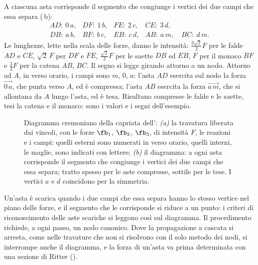 \begin{esempio}
\begin{svolgimento}
		A ciascuna asta corrisponde il segmento che congiunge i vertici dei due campi che essa separa
		(\,b):
		\begin{equation*}
			\begin{array}{llll}
				AD:\ 0\,a , & DF:\ 1\,b , & FE:\ 2\,c , & CE:\ 3\,d , \\[2pt]
				DB:\ a\,b , & BF:\ b\,c , &
				EB:\ c\,d , & AB:\ a\,m , \quad BC:\ d\,m .
			\end{array}
		\end{equation*}
		Le lunghezze, lette nella scala delle forze, danno le intensità: $\tfrac{3\sqrt{2}}{2}F$ per
		le falde $AD$ e $CE$, $\sqrt{2}\,F$ per $DF$ e $FE$, $\tfrac{\sqrt{2}}{2}F$ per le saette $DB$
		ed $EB$, $F$ per il monaco $BF$ e $\tfrac{3}{2}F$ per la catena $AB$, $BC$. Il segno si legge
		girando attorno a un nodo. Attorno ad $A$, in verso orario, i campi sono $m$, $0$,
		$a$: l'asta $AD$ esercita sul nodo la forza $\overrightarrow{0\,a}$, che punta
		verso $A$, ed è compressa; l'asta $AB$ esercita la forza $\overrightarrow{a\,m}$, che
		si allontana da $A$ lungo l'asta, ed è tesa. Risultano compresse le falde e le saette, tesi la
		catena e il monaco: sono i valori e i segni dell'esempio.
	\end{svolgimento}
\end{esempio}

\begin{figure}[htbp]
	\centering
	\caption{Diagramma cremoniano della capriata dell':
		\emph{(a)} la travatura liberata dai vincoli, con le forze $\fb_1$, $\fb_2$, $\fb_3$, di
		intensità $F$, le reazioni e i campi: quelli esterni sono numerati in verso orario, quelli
		interni, le maglie, sono indicati con lettere; \emph{(b)} il diagramma: a ogni asta
		corrisponde il segmento che
		congiunge i vertici dei due campi che essa separa; tratto spesso per le aste compresse, sottile
		per le tese. I vertici $a$ e $d$ coincidono per la simmetria.}
	\label{fig:cremoniano_sgr}
\end{figure}

\begin{oss}
	\label{oss:limiti_cremoniano_sgr}
	Un'asta è scarica quando i due campi che essa separa hanno lo stesso vertice nel piano delle
	forze, e il segmento che le corrisponde si riduce a un punto: i criteri di riconoscimento delle
	aste scariche si leggono così sul diagramma. Il procedimento richiede, a ogni passo, un nodo
	canonico. Dove la propagazione a cascata si arresta, come nelle travature che non si risolvono
	con il solo metodo dei nodi, si interrompe anche il diagramma, e la forza di un'asta va prima
	determinata con una sezione di Ritter ().
\end{oss}

